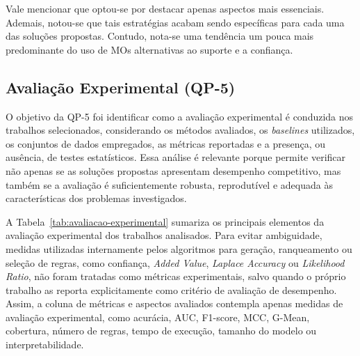 Vale mencionar que optou-se por destacar apenas aspectos mais essenciais. Ademais, notou-se que tais estratégias acabam sendo específicas para cada uma das soluções propostas. Contudo, nota-se uma tendência um pouca mais predominante do uso de MOs alternativas ao suporte e a confiança.


\subsection{Avaliação Experimental (QP-5)}
\label{sec:qp5}

O objetivo da QP-5 foi identificar como a avaliação experimental é conduzida nos trabalhos selecionados, considerando os métodos avaliados, os \textit{baselines} utilizados, os conjuntos de dados empregados, as métricas reportadas e a presença, ou ausência, de testes estatísticos. Essa análise é relevante porque permite verificar não apenas se as soluções propostas apresentam desempenho competitivo, mas também se a avaliação é suficientemente robusta, reprodutível e adequada às características dos problemas investigados.

A Tabela~\ref{tab:avaliacao-experimental} sumariza os principais elementos da avaliação experimental dos trabalhos analisados. Para evitar ambiguidade, medidas utilizadas internamente pelos algoritmos para geração, ranqueamento ou seleção de regras, como confiança, \textit{Added Value}, \textit{Laplace Accuracy} ou \textit{Likelihood Ratio}, não foram tratadas como métricas experimentais, salvo quando o próprio trabalho as reporta explicitamente como critério de avaliação de desempenho. Assim, a coluna de métricas e aspectos avaliados contempla apenas medidas de avaliação experimental, como acurácia, AUC, F1-score, MCC, G-Mean, cobertura, número de regras, tempo de execução, tamanho do modelo ou interpretabilidade.


